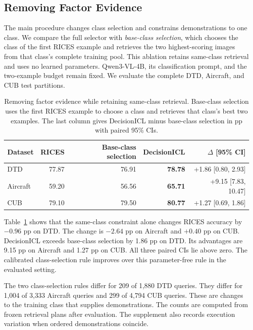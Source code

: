 \documentclass[10pt,twocolumn,letterpaper]{article}
\newcommand{\method}{DecisionICL\xspace}
\begin{document}
\subsection{Removing Factor Evidence}
\label{sec:gateablation}
The main procedure changes class selection and constrains demonstrations to one class. We compare the full selector with \emph{base-class selection}, which chooses the class of the first RICES example and retrieves the two highest-scoring images from that class's complete training pool. This ablation retains same-class retrieval and uses no learned parameters. Qwen3-VL-4B, its classification prompt, and the two-example budget remain fixed. We evaluate the complete DTD, Aircraft, and CUB test partitions.

\begin{table}[t]
\caption{Removing factor evidence while retaining same-class retrieval. Base-class selection uses the first RICES example to choose a class and retrieves that class's best two examples. The last column gives \method minus base-class selection in pp with paired 95\% CIs.}
\label{tab:gate}
\centering\small
\setlength{\tabcolsep}{9pt}
\begin{tabular}{lrrrr}
\toprule
Dataset & RICES & Base-class selection & DecisionICL & $\Delta$ [95\% CI] \\
\midrule
DTD & 77.87 & 76.91 & \textbf{78.78} & +1.86 [0.80, 2.93] \\
Aircraft & 59.20 & 56.56 & \textbf{65.71} & +9.15 [7.83, 10.47] \\
CUB & 79.10 & 79.50 & \textbf{80.77} & +1.27 [0.69, 1.86] \\
\bottomrule
\end{tabular}
\end{table}

Table~\ref{tab:gate} shows that the same-class constraint alone changes RICES accuracy by $-0.96$ pp on DTD. The change is $-2.64$ pp on Aircraft and $+0.40$ pp on CUB. DecisionICL exceeds base-class selection by 1.86 pp on DTD. Its advantages are 9.15 pp on Aircraft and 1.27 pp on CUB. All three paired CIs lie above zero. The calibrated class-selection rule improves over this parameter-free rule in the evaluated setting.

The two class-selection rules differ for 209 of 1,880 DTD queries. They differ for 1,004 of 3,333 Aircraft queries and 299 of 4,794 CUB queries. These are changes to the training class that supplies demonstrations. The counts are computed from frozen retrieval plans after evaluation. The supplement also records execution variation when ordered demonstrations coincide.
\end{document}
